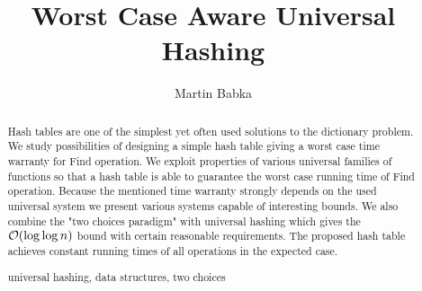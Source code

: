 \documentclass[runningheads,a4paper]{llncs}
\newcommand{\keywords}[1]{\par\addvspace\baselineskip
\noindent\keywordname\enspace\ignorespaces#1}
\begin{document}
\mainmatter

\author{Martin Babka}

\title{Worst Case Aware Universal Hashing}



\maketitle

\begin{abstract}
Hash tables are one of the simplest yet often used solutions to the dictionary problem. 
We study possibilities of designing a simple hash table giving a worst case time warranty for Find operation.
We exploit properties of various universal families of functions so that a hash table is able to guarantee the worst case running time of Find operation.
Because the mentioned time warranty strongly depends on the used universal system we present various systems capable of interesting bounds.
We also combine the "two choices paradigm" with universal hashing which gives the $\mathcal{O}(\log \log n)$ bound with certain reasonable requirements.
The proposed hash table achieves constant running times of all operations in the expected case.

\keywords{universal hashing, data structures, two choices}
\end{abstract}








\end{document}
